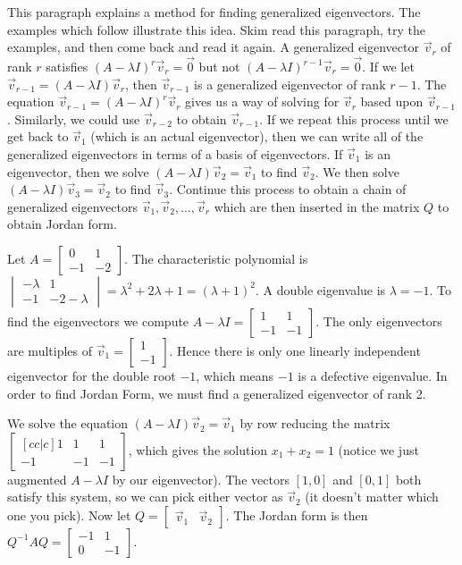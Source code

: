 This paragraph explains a method for finding generalized eigenvectors.  The examples which follow illustrate this idea. Skim read this paragraph, try the examples, and then come back and read it again. A generalized eigenvector $\vec v_r$ of rank $r$ satisfies $(A-\lambda I)^r\vec v_r=\vec 0$ but not $(A-\lambda I)^{r-1}\vec v_r=\vec 0$.  If we let $\vec v_{r-1}= (A-\lambda I)\vec v_r$, then $\vec v_{r-1}$ is a generalized eigenvector of rank $r-1$. The equation $\vec v_{r-1}=(A-\lambda I)^r\vec v_r$ gives us a way of solving for $\vec v_{r}$ based upon $\vec v_{r-1}$. Similarly, we could use $\vec v_{r-2}$ to obtain $\vec v_{r-1}$.   If we repeat this process until we get back to $\vec v_1$ (which is an actual eigenvector), then we can write all of the generalized eigenvectors in terms of a basis of eigenvectors. If $\vec v_1$ is an eigenvector, then we solve $(A-\lambda I)\vec v_2 =\vec v_1$ to find $\vec v_2$. We then solve  $(A-\lambda I)\vec v_3 =\vec v_2$ to find $\vec v_3$. Continue this process to obtain a chain of generalized eigenvectors $\vec v_1, \vec v_2, \ldots, \vec v_r$ which are then inserted in the matrix $Q$ to obtain Jordan form.

\begin{example}
Let $A=\begin {bmatrix} 0&1\\-1&-2\end {bmatrix}$. The characteristic polynomial is $\begin {vmatrix} -\lambda&1\\-1&-2-\lambda\end {vmatrix}= \lambda^2+2\lambda+1=(\lambda+1)^2$. A double eigenvalue is $\lambda=-1$.  To find the eigenvectors we compute {$A-\lambda I = \begin {bmatrix} 1&1\\-1&-1\end {bmatrix} $}. The only eigenvectors are multiples of $\vec v_1 = \begin {bmatrix} 1\\-1\end {bmatrix}$. Hence there is only one linearly independent eigenvector for the double root $-1$, which means $-1$ is a defective eigenvalue. In order to find Jordan Form, we must find a generalized eigenvector of rank 2. 

We solve the equation 
$(A-\lambda I)\vec v_2=\vec v_1$ by row reducing the matrix 
$\begin {bmatrix}[cc|c] 1&1&1\\-1&-1&-1\end {bmatrix}$, which gives the solution $x_1+x_2=1$ (notice we just augmented $A-\lambda I$ by our eigenvector).  The vectors $[1,0]$ and $[0,1]$ both satisfy this system, so we can pick either vector as $\vec v_2$ (it doesn't matter which one you pick). Now let $Q=\begin{bmatrix}\vec v_1 &\vec v_2\end{bmatrix}$. The Jordan form is then $Q^{-1}AQ =\begin {bmatrix} -1&1\\0&-1\end {bmatrix}$.  
\end{example}

